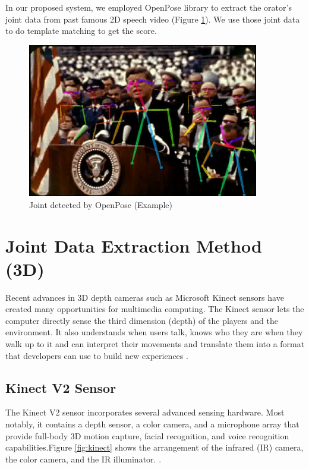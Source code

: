 \par In our proposed system, we employed OpenPose library to extract the orator's joint data from past famous 2D speech video (Figure \ref{fig:jfkexample}). We use those joint data to do template matching to get the score.
\begin{figure}[!htbp]
  \centering\includegraphics[width=0.9\textwidth]{./img/jfk.png}
  \caption{Joint detected by OpenPose (Example)}\label{fig:jfkexample}
\end{figure}



\section{Joint Data Extraction Method (3D)}
\par Recent advances in 3D depth cameras such as Microsoft Kinect sensors have created many opportunities for multimedia computing. The Kinect sensor lets the computer directly sense the third dimension (depth) of the players and the environment. It also understands when users talk, knows who they are when they walk up to it and can interpret their movements and translate them into a format that developers can use to build new experiences \cite{Zhang2012}.
\subsection*{Kinect V2 Sensor}
\par The Kinect V2 sensor incorporates several advanced sensing hardware. Most notably, it contains a depth sensor, a color camera, and a microphone array that provide full-body 3D motion capture, facial recognition, and voice recognition capabilities.Figure \ref{fig:kinect} shows the arrangement of the infrared (IR) camera, the color camera, and the IR illuminator. . 

